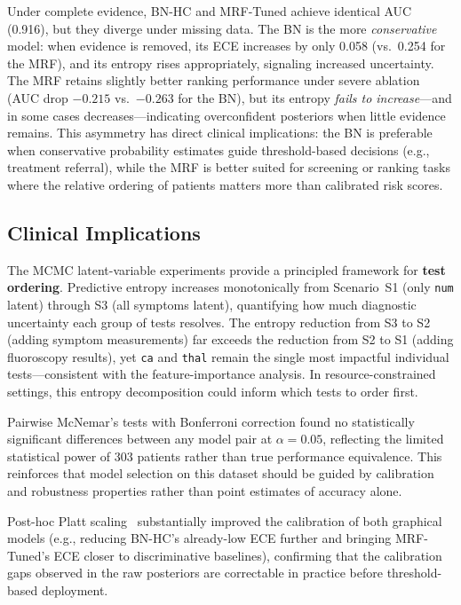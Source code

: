 \documentclass{article}
\begin{document}
Under complete evidence, BN-HC and MRF-Tuned achieve identical AUC
(0.916), but they diverge under missing data. The BN is the more
\emph{conservative} model: when evidence is removed, its ECE increases by only
0.058 (vs.\ 0.254 for the MRF), and its entropy rises appropriately,
signaling increased uncertainty. The MRF retains slightly better ranking
performance under severe ablation (AUC drop $-0.215$ vs.\ $-0.263$ for the
BN), but its entropy \emph{fails to increase}---and in some cases
decreases---indicating overconfident posteriors when little evidence remains.
This asymmetry has direct clinical implications: the BN is preferable when
conservative probability estimates guide threshold-based decisions (e.g.,
treatment referral), while the MRF is better suited for screening or ranking
tasks where the relative ordering of patients matters more than calibrated
risk scores.

\subsection{Clinical Implications}

The MCMC latent-variable experiments provide a principled framework for
\textbf{test ordering}. Predictive entropy increases monotonically from
Scenario~S1 (only \texttt{num} latent) through S3 (all symptoms latent),
quantifying how much diagnostic uncertainty each group of tests resolves.
The entropy reduction from S3 to S2 (adding symptom measurements) far exceeds
the reduction from S2 to S1 (adding fluoroscopy results), yet \texttt{ca} and
\texttt{thal} remain the single most impactful individual tests---consistent
with the feature-importance analysis. In resource-constrained settings, this
entropy decomposition could inform which tests to order first.

Pairwise McNemar's tests with Bonferroni correction found no statistically
significant differences between any model pair at $\alpha = 0.05$, reflecting
the limited statistical power of 303 patients rather than true performance
equivalence. This reinforces that model selection on this dataset should be
guided by calibration and robustness properties rather than point estimates of
accuracy alone.

Post-hoc Platt scaling~\cite{platt1999scaling} substantially improved the
calibration of both graphical models (e.g., reducing BN-HC's already-low ECE
further and bringing MRF-Tuned's ECE closer to discriminative baselines),
confirming that the calibration gaps observed in the raw posteriors are
correctable in practice before threshold-based deployment.
\end{document}
